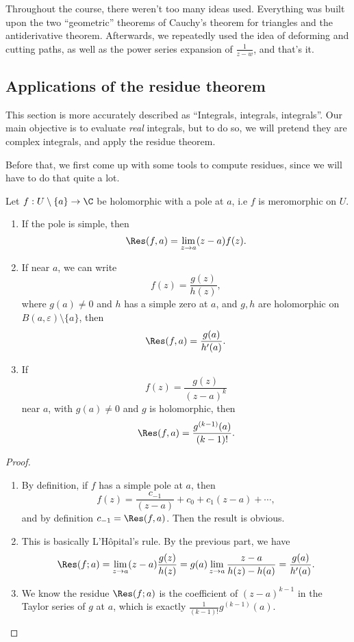 \documentclass[a4paper]{article}
\begin{document}
Throughout the course, there weren't too many ideas used. Everything was built upon the two ``geometric'' theorems of Cauchy's theorem for triangles and the antiderivative theorem. Afterwards, we repeatedly used the idea of deforming and cutting paths, as well as the power series expansion of $\frac{1}{z - w}$, and that's it.

\subsection{Applications of the residue theorem}
This section is more accurately described as ``Integrals, integrals, integrals''. Our main objective is to evaluate \emph{real} integrals, but to do so, we will pretend they are complex integrals, and apply the residue theorem.

Before that, we first come up with some tools to compute residues, since we will have to do that quite a lot.

\begin{lemma}
  Let $f: U \setminus \{a\} \to \C$ be holomorphic with a pole at $a$, i.e $f$ is meromorphic on $U$.
  \begin{enumerate}
    \item If the pole is simple, then
      \[
        \Res(f, a) = \lim_{z \to a} (z - a) f(z).
      \]
    \item If near $a$, we can write
      \[
        f(z) = \frac{g(z)}{h(z)},
      \]
      where $g(a) \not= 0$ and $h$ has a simple zero at $a$, and $g, h$ are holomorphic on $B(a, \varepsilon) \setminus \{a\}$, then
      \[
        \Res(f, a) = \frac{g(a)}{h'(a)}.
      \]
    \item If
      \[
        f(z) = \frac{g(z)}{(z - a)^k}
      \]
      near $a$, with $g(a) \not= 0$ and $g$ is holomorphic, then
      \[
        \Res(f, a) = \frac{g^{(k - 1)}(a)}{(k - 1)!}.
      \]
  \end{enumerate}
\end{lemma}

\begin{proof}\leavevmode
  \begin{enumerate}
    \item By definition, if $f$ has a simple pole at $a$, then
      \[
        f(z) = \frac{c_{-1}}{(z - a)} + c_0 + c_1(z - a) + \cdots,
      \]
      and by definition $c_{-1} = \Res(f, a)$. Then the result is obvious.
    \item This is basically L'H\^opital's rule. By the previous part, we have
      \[
        \Res(f; a) = \lim_{z \to a} (z - a)\frac{g(z)}{h(z)} = g(a) \lim_{z \to a} \frac{z - a}{h(z) - h(a)} = \frac{g(a)}{h'(a)}.
      \]
    \item We know the residue $\Res(f; a)$ is the coefficient of $(z - a)^{k - 1}$ in the Taylor series of $g$ at $a$, which is exactly $\frac{1}{(k - 1)!} g^{(k - 1)}(a)$.
  \end{enumerate}
\end{proof}
\end{document}
